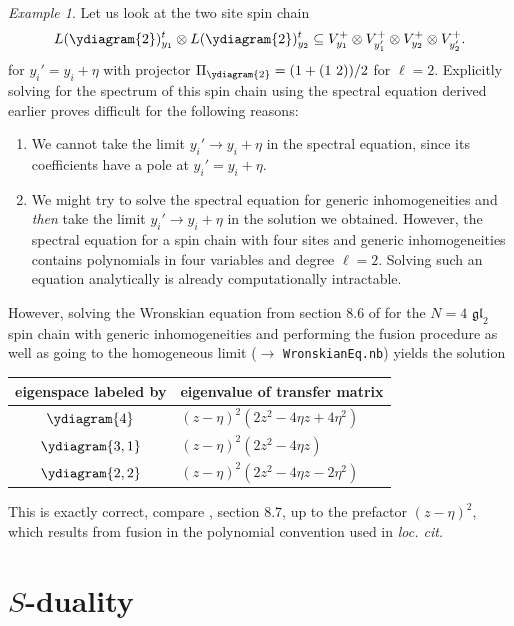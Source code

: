 \documentclass[11pt]{report}
\theoremstyle{definition}
\theoremstyle{remark}
\theoremstyle{remark}
\newtheorem*{example}{Example}
\begin{document}
\begin{example}
Let us look at the two site spin chain
\begin{equation*}
L(\ydiagram{2})_{y_1}^t \otimes L(\ydiagram{2})_{y_2}^t \subseteq V_{y_1}^+ \otimes V_{y_1'}^+ \otimes V_{y_2}^+ \otimes V_{y_2'}^+.
\end{equation*}
for $y_i' = y_i+\eta$ with projector $\Pi_{\ydiagram{2}} = (1 + (1 \ 2))/2$ for $\ell=2$. Explicitly solving for the spectrum of this spin chain using the spectral equation derived earlier proves difficult for the following reasons:
\begin{enumerate}[label=(\roman*)]
\item We cannot take the limit $y_i' \to y_i + \eta$ in the spectral equation, since its coefficients have a pole at $y_i'=y_i+\eta$.
\item We might try to solve the spectral equation for generic inhomogeneities and \emph{then} take the limit $y_i' \to y_i + \eta$ in the solution we obtained. However, the spectral equation for a spin chain with four sites and generic inhomogeneities contains polynomials in four variables and degree $\ell = 2$. Solving such an equation analytically is already computationally intractable.
\end{enumerate}
However, solving the Wronskian equation from section 8.6 of \cite{book:arutyunov:betheAnsatz} for the $N=4$ $\mathfrak{gl}_2$ spin chain with generic inhomogeneities and performing the fusion procedure as well as going to the homogeneous limit ($\to$ \texttt{WronskianEq.nb}) yields the solution
\begin{center}
\begin{tabular}{|c||l|}
\hline
eigenspace labeled by & eigenvalue of transfer matrix \\
\hline
$\ydiagram{4}$ & $(z-\eta)^2 (2 z^2 - 4 \eta z + 4 \eta^2)$ \\
$\ydiagram{3,1}$ & $(z-\eta)^2 (2 z^2 - 4 \eta z)$ \\
$\ydiagram{2,2}$ & $(z-\eta)^2 (2 z^2 - 4 \eta z - 2 \eta^2)$ \\
\hline
\end{tabular}
\end{center}
This is exactly correct, compare \cite{book:arutyunov:betheAnsatz}, section 8.7, up to the prefactor $(z-\eta)^2$, which results from fusion in the polynomial convention used in \emph{loc. cit.}
\end{example}

\section{$S$-duality}
\end{document}
